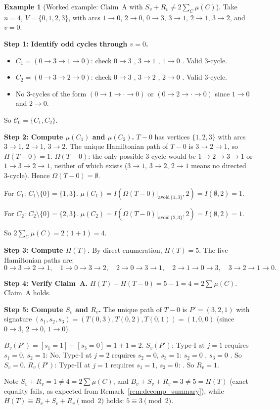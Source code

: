 \documentclass[12pt,reqno]{amsart}
\newcommand{\xmark}{\ding{55}}
\theoremstyle{plain}
\theoremstyle{definition}
\newtheorem{example}[theorem]{Example}
\theoremstyle{remark}
\begin{document}
\begin{example}[Worked example: Claim~A with $S_v + R_v \neq 2\sum_C \mu(C)$]
\label{ex:counterexample}
Take $n=4$, $V = \{0,1,2,3\}$, with arcs $1\to 0$, $2\to 0$, $0\to 3$,
$3\to 1$, $2\to 1$, $3\to 2$, and $v = 0$.

\medskip\noindent
\textbf{Step 1: Identify odd cycles through $v=0$.}
\begin{itemize}[nosep]
  \item $C_1 = (0 \to 3 \to 1 \to 0)$: check $0\to3$ \checkmark, $3\to1$ \checkmark,
    $1\to0$ \checkmark. Valid 3-cycle.
  \item $C_2 = (0 \to 3 \to 2 \to 0)$: check $0\to3$ \checkmark, $3\to2$ \checkmark,
    $2\to0$ \checkmark. Valid 3-cycle.
  \item No 3-cycles of the form $(0 \to 1 \to \cdot \to 0)$ or
    $(0 \to 2 \to \cdot \to 0)$ since $1\to0$ and $2\to0$.
\end{itemize}
So $\mathcal{C}_0 = \{C_1, C_2\}$.

\medskip\noindent
\textbf{Step 2: Compute $\mu(C_1)$ and $\mu(C_2)$.}
$T{-}0$ has vertices $\{1,2,3\}$ with arcs $3\to1$, $2\to1$, $3\to2$.
The unique Hamiltonian path of $T{-}0$ is $3\to2\to1$, so $H(T{-}0) = 1$.
$\Omega(T{-}0)$: the only possible 3-cycle would be $1\to2\to3\to1$ or $1\to3\to2\to1$,
neither of which exists ($3\to1$, $3\to2$, $2\to1$ means no directed 3-cycle).
Hence $\Omega(T{-}0) = \emptyset$.

For $C_1$: $C_1 \setminus \{0\} = \{1,3\}$.
$\mu(C_1) = I(\Omega(T{-}0)|_{\mathrm{avoid}\,\{1,3\}}, 2) = I(\emptyset, 2) = 1$.

For $C_2$: $C_2 \setminus \{0\} = \{2,3\}$.
$\mu(C_2) = I(\Omega(T{-}0)|_{\mathrm{avoid}\,\{2,3\}}, 2) = I(\emptyset, 2) = 1$.

So $2\sum_C \mu(C) = 2(1+1) = 4$.

\medskip\noindent
\textbf{Step 3: Compute $H(T)$.}
By direct enumeration, $H(T) = 5$. The five Hamiltonian paths are:
\[
0{\to}3{\to}2{\to}1,\quad
1{\to}0{\to}3{\to}2,\quad
2{\to}0{\to}3{\to}1,\quad
2{\to}1{\to}0{\to}3,\quad
3{\to}2{\to}1{\to}0.
\]

\medskip\noindent
\textbf{Step 4: Verify Claim~A.} $H(T) - H(T{-}0) = 5 - 1 = 4 = 2\sum\mu(C)$.
\checkmark Claim~A holds.

\medskip\noindent
\textbf{Step 5: Compute $S_v$ and $R_v$.}
The unique path of $T{-}0$ is $P' = (3,2,1)$ with signature
$(s_1, s_2, s_3) = (T(0,3), T(0,2), T(0,1)) = (1, 0, 0)$
(since $0\to3$, $2\to0$, $1\to0$).

$B_v(P') = [s_1=1] + [s_3=0] = 1 + 1 = 2$.
$S_v(P')$: Type-I at $j=1$ requires $s_1=0$, $s_2=1$: No. Type-I at $j=2$
requires $s_2=0$, $s_3=1$: $s_2=0$ \checkmark, $s_3=0$ \xmark. So $S_v = 0$.
$R_v(P')$: Type-II at $j=1$ requires $s_1=1$, $s_2=0$: \checkmark. So $R_v = 1$.

Note $S_v + R_v = 1 \neq 4 = 2\sum\mu(C)$, and $B_v + S_v + R_v = 3 \neq 5 = H(T)$
(exact equality fails, as expected from Remark~\ref{rem:decomp_summary}), while
$H(T) \equiv B_v + S_v + R_v \pmod 2$ holds: $5 \equiv 3 \pmod 2$. \checkmark
\end{example}
\end{document}
